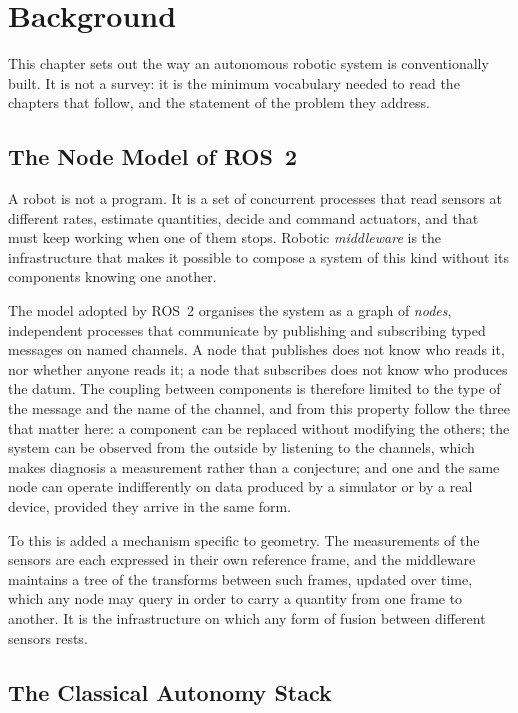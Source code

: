 \chapter{Background}
\label{ch:background}

This chapter sets out the way an autonomous robotic system is conventionally
built. It is not a survey: it is the minimum vocabulary needed to read the
chapters that follow, and the statement of the problem they address.

\section{The Node Model of ROS~2}
\label{sec:bg-ros2}

A robot is not a program. It is a set of concurrent processes that read sensors
at different rates, estimate quantities, decide and command actuators, and that
must keep working when one of them stops. Robotic \emph{middleware} is the
infrastructure that makes it possible to compose a system of this kind without
its components knowing one another.

The model adopted by ROS~2 \cite{macenski2022ros2} organises the system as a
graph of \emph{nodes}, independent processes that communicate by publishing and
subscribing typed messages on named channels. A node that publishes does not
know who reads it, nor whether anyone reads it; a node that subscribes does not
know who produces the datum. The coupling between components is therefore
limited to the type of the message and the name of the channel, and from this
property follow the three that matter here: a component can be replaced without
modifying the others; the system can be observed from the outside by listening
to the channels, which makes diagnosis a measurement rather than a conjecture;
and one and the same node can operate indifferently on data produced by a
simulator or by a real device, provided they arrive in the same form.

To this is added a mechanism specific to geometry. The measurements of the
sensors are each expressed in their own reference frame, and the middleware
maintains a tree of the transforms between such frames, updated over time, which
any node may query in order to carry a quantity from one frame to another. It is
the infrastructure on which any form of fusion between different sensors rests.

\section{The Classical Autonomy Stack}
\label{sec:bg-stack}

